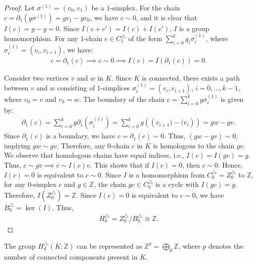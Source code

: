 \begin{proof}
	Let \( \sigma^{(1)} = (v_{0}, v_{1}) \) be a \( 1 \)-simplex. For the chain \( c = \partial_{1}(g \sigma^{(1)}) = g v_{1} - g v_{0} \), we have \( c \sim 0 \), and it is clear that \( I(c) = g - g = 0 \). Since \( I(c + c') = I(c) + I(c') \), \( I \) is a group homomorphism. For any \( 1 \)-chain \( c \in C^{\triangle}_{1} \) of the form \( \sum_{i=0}^{k} g_{i} \sigma_{i}^{(1)} \), where \( \sigma_{i}^{(1)} = (v_{i}, v_{i+1}) \), we have:
	\begin{align}
		c = \partial_{1}(c) \implies c \sim 0 \implies I(c) = I(\partial_{1}(c)) = 0. 
	\end{align}
				
	Consider two vertices \( v \) and \( w \) in \( K \). Since \( K \) is connected, there exists a path between \( v \) and \( w \) consisting of \( 1 \)-simplices \( \sigma_{i}^{(1)} = (v_{i}, v_{i+1}) \), \( i = 0, \ldots, k-1 \), where \( v_{0} = v \) and \( v_{k} = w \). The boundary of the chain \( c = \sum_{i=0}^{k} g \sigma_{i}^{(1)} \) is given by:
	\begin{align}
		\partial_{1}(c) = \sum_{i=0}^{k} g \partial_{1}(\sigma_{i}^{(1)}) = \sum_{i=0}^{k} g \left(\left(v_{i+1}) - (v_{i}\right)\right) = g w - g v. 
	\end{align}
	Since \( \partial_{1}(c) \) is a boundary, we have \( c = \partial_{1}(c) \sim 0 \). Thus, \( (g w - g v) \sim 0 \), implying \( g w \sim g v \). Therefore, any \( 0 \)-chain \( c \) in \( K \) is homologous to the chain \( g v \). We observe that homologous chains have equal indices, i.e., \( I(c) = I(g v) = g \). Thus, \( c \sim g v \implies c \sim I(c) v \). This shows that if \( I(c) = 0 \), then \( c \sim 0 \). Hence, \( I(c) = 0 \) is equivalent to \( c \sim 0 \). Since \( I \) is a homomorphism from \( C^{\triangle}_{0} = Z^{\triangle}_{0} \) to \( \mathbb{Z} \), for any \( 0 \)-simplex \( c \) and \( g \in \mathbb{Z} \), the chain \( g c \in C^{\triangle}_{0} \) is a cycle with \( I(g c) = g \). Therefore, \( I(Z^{\triangle}_{0}) = \mathbb{Z} \). Since \( I(c) = 0 \) is equivalent to \( c \sim 0 \), we have \( B^{\triangle}_{0} = \ker(I) \). Thus,
	\begin{align}
		H^{\triangle}_{0} = Z^{\triangle}_{0} / B^{\triangle}_{0} \cong \mathbb{Z}. 
	\end{align}
\end{proof}

\begin{corollary}
	\label{directsum0hom}
	The group $H_d^\triangle(K;\mathbb{Z})$ can be represented as \( \mathbb{Z}^{p} = \bigoplus_{p} \mathbb{Z} \), where \( p \) denotes the number of connected components present in \( K \).
\end{corollary}

